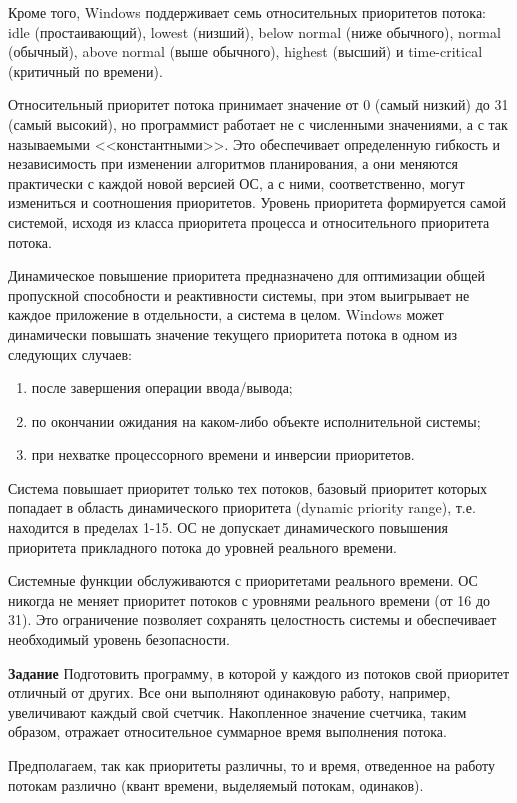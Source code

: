 \documentclass[a4paper]{article}
\begin{document}
	Кроме того, Windows поддерживает семь относительных приоритетов потока: idle (простаивающий), lowest (низший), below normal (ниже обычного), normal (обычный), above normal (выше обычного), highest (высший) и time-critical (критичный по времени).
	
	Относительный приоритет потока принимает значение от 0 (самый низкий) до 31 (самый высокий), но программист работает не с численными значениями, а с так называемыми <<константными>>. Это обеспечивает определенную гибкость и независимость при изменении алгоритмов планирования, а они меняются практически с каждой новой версией ОС, а с ними, соответственно, могут измениться и соотношения приоритетов.
Уровень приоритета формируется самой системой, исходя из класса приоритета процесса и относительного приоритета потока.

	Динамическое повышение приоритета предназначено для оптимизации общей пропускной способности и реактивности системы, при этом выигрывает не каждое приложение в отдельности, а система в целом.
Windows может динамически повышать значение текущего приоритета потока в одном из следующих случаев:
	\begin{enumerate}
	\item после завершения операции ввода/вывода;
	\item по окончании ожидания на каком-либо объекте исполнительной системы;
	\item при нехватке процессорного времени и инверсии приоритетов.	
	\end{enumerate}
	
	Система повышает приоритет только тех потоков, базовый приоритет которых попадает в область динамического приоритета (dynamic priority range), т.е. находится в пределах 1-15. ОС не допускает динамического повышения приоритета прикладного потока до уровней реального времени.
	
	Системные функции обслуживаются с приоритетами реального времени. ОС никогда не меняет приоритет потоков с уровнями реального времени (от 16 до 31). Это ограничение позволяет сохранять целостность системы и обеспечивает необходимый уровень безопасности.
	
	\textbf{Задание} Подготовить программу, в которой у каждого из потоков свой приоритет отличный от других. Все они выполняют одинаковую работу, например, увеличивают каждый свой счетчик. Накопленное значение счетчика, таким образом, отражает относительное суммарное время выполнения потока.
	
	Предполагаем, так как приоритеты различны, то и время, отведенное на работу потокам различно (квант времени, выделяемый потокам, одинаков).
	
\end{document}
